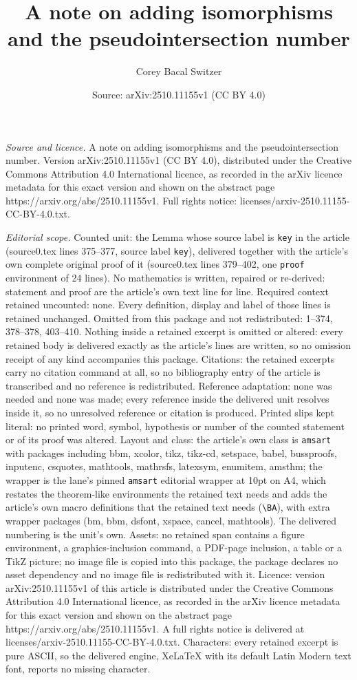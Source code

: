 \documentclass[10pt,a4paper]{amsart}
\title[A note on adding isomorphisms and the pseudointersection num]{A note on adding isomorphisms and the pseudointersection number}
\author{Corey Bacal Switzer}
\date{Source: arXiv:2510.11155v1 (CC BY 4.0)}
\begin{document}
\maketitle

\noindent\emph{Source and licence.} A note on adding isomorphisms and the pseudointersection number. Version arXiv:2510.11155v1 (CC BY 4.0), distributed under the Creative Commons Attribution 4.0 International licence, as recorded in the arXiv licence metadata for this exact version and shown on the abstract page https://arxiv.org/abs/2510.11155v1. Full rights notice: licenses/arxiv-2510.11155-CC-BY-4.0.txt.\par\smallskip

\noindent\textit{Editorial scope.} Counted unit: the Lemma whose source label is \texttt{key} in the article (source0.tex lines 375--377, source label \texttt{key}), delivered together with the article's own complete original proof of it (source0.tex lines 379--402, one \texttt{proof} environment of 24 lines). No mathematics is written, repaired or re-derived: statement and proof are the article's own text line for line. Required context retained uncounted: none. Every definition, display and label of those lines is retained unchanged. Omitted from this package and not redistributed: 1--374, 378--378, 403--410. Nothing inside a retained excerpt is omitted or altered: every retained body is delivered exactly as the article's lines are written, so no omission receipt of any kind accompanies this package. Citations: the retained excerpts carry no citation command at all, so no bibliography entry of the article is transcribed and no reference is redistributed. Reference adaptation: none was needed and none was made; every reference inside the delivered unit resolves inside it, so no unresolved reference or citation is produced. Printed slips kept literal: no printed word, symbol, hypothesis or number of the counted statement or of its proof was altered. Layout and class: the article's own class is \texttt{amsart} with packages including bbm, xcolor, tikz, tikz-cd, setspace, babel, bussproofs, inputenc, csquotes, mathtools, mathrsfs, latexsym, enumitem, amsthm; the wrapper is the lane's pinned \texttt{amsart} editorial wrapper at 10pt on A4, which restates the theorem-like environments the retained text needs and adds the article's own macro definitions that the retained text needs (\texttt{\textbackslash BA}), with extra wrapper packages (bm, bbm, dsfont, xspace, cancel, mathtools). The delivered numbering is the unit's own. Assets: no retained span contains a figure environment, a graphics-inclusion command, a PDF-page inclusion, a table or a TikZ picture; no image file is copied into this package, the package declares no asset dependency and no image file is redistributed with it. Licence: version arXiv:2510.11155v1 of this article is distributed under the Creative Commons Attribution 4.0 International licence, as recorded in the arXiv licence metadata for this exact version and shown on the abstract page https://arxiv.org/abs/2510.11155v1. A full rights notice is delivered at licenses/arxiv-2510.11155-CC-BY-4.0.txt. Characters: every retained excerpt is pure ASCII, so the delivered engine, XeLaTeX with its default Latin Modern text font, reports no missing character.
\end{document}
